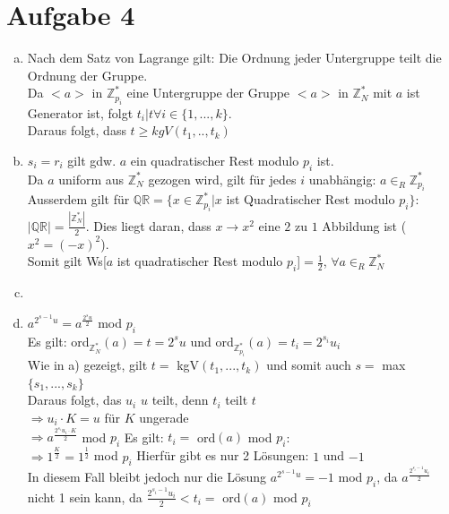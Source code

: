 \documentclass[a4paper]{scrartcl}
\begin{document}
\section*{Aufgabe 4}
\begin{enumerate}[a)]
\item Nach dem Satz von Lagrange gilt: Die Ordnung jeder Untergruppe teilt die Ordnung der Gruppe.\\
Da $<a>$ in $\mathbb{Z}_{p_i}^*$ eine Untergruppe der Gruppe $<a>$ in $\mathbb{Z}_N^*$ mit $a$ ist Generator ist, folgt $t_i | t \forall i \in \{1, ..., k\}$.\\
Daraus folgt, dass $t\geq kgV(t_1,..,t_k)$


\item $s_i = r_i$ gilt gdw. $a$ ein quadratischer Rest modulo $p_i$ ist.\\
 Da $a$ uniform aus $\mathbb{Z}_N^*$ gezogen wird, gilt für jedes $i$ unabhängig: $a\in_R\mathbb{Z}_{p_i}^*$\\
Ausserdem gilt für $\mathbb{QR}=\{x\in \mathbb{Z}_{p_i}^*|x$ ist Quadratischer Rest modulo $p_i\}$: $|\mathbb{QR}|=\frac{|\mathbb{Z}_N^*|}{2}$. Dies liegt daran, dass $x \rightarrow x^2$ eine $2$ zu $1$ Abbildung ist ($x^2=(-x)^2$).\\
Somit gilt Ws[$a$ ist quadratischer Rest modulo $p_i$]$=\frac{1}{2}$, $\forall a\in_R\mathbb{Z}_N^*$

\item 

\item $a^{2^{s-1}u}= a^{\frac{2^{s}u}{2}}$ mod $p_i$\\
Es gilt: ord$_{\mathbb{Z}_N^*}(a)=t=2^{s}u$ und ord$_{\mathbb{Z}_{p_i}^*}(a)=t_i=2^{s_i}u_i$\\
Wie in a) gezeigt, gilt $t=$ kgV$(t_1,...,t_k)$ und somit auch $s=$ max$\{s_1, ...,s_k\}$\\
Daraus folgt, das $u_i$ $u$ teilt, denn $t_i$ teilt $t$\\
$\Rightarrow u_i \cdot K = u$ für $K$ ungerade\\
$\Rightarrow a^{\frac{2^{s_i}u_i\cdot K}{2}}$ mod $p_i$ Es gilt: $t_i = $ ord$(a)$ mod $p_i$:\\
$\Rightarrow 1^{\frac{K}{2}} = 1^{\frac{1}{2}}$ mod $p_i$ Hierfür gibt es nur 2 Lösungen: $1$ und $-1$\\
In diesem Fall bleibt jedoch nur die Lösung $a^{2^{s-1}u}= -1$ mod $p_i$, da $a^{\frac{2^{s_i-1}u_i}{2}}$ nicht 1 sein kann, da $\frac{2^{s_i-1}u_i}{2} < t_i =$ ord$(a)$ mod $p_i$ 


\end{enumerate}
\end{document}
